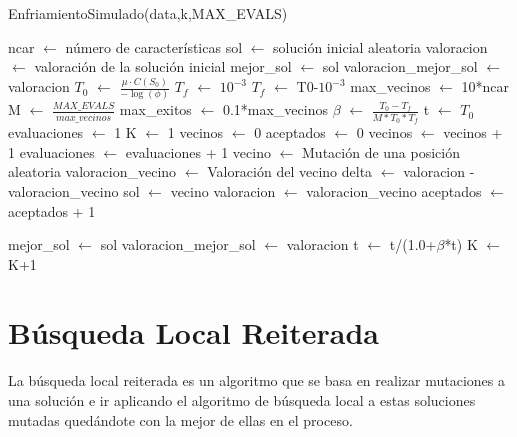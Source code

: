 \documentclass[12pt,a4paper]{article}
\begin{document}
	\begin{algorithm}
		\caption{EnfriamientoSimulado(data,k,MAX\_EVALS)}
		\begin{algorithmic}
			\STATE ncar $\leftarrow$ número de características
			\STATE sol  $\leftarrow$ solución inicial aleatoria
			\STATE valoracion $\leftarrow$ valoración de la solución inicial
			\STATE mejor\_sol $\leftarrow$ sol
			\STATE valoracion\_mejor\_sol $\leftarrow$ valoracion
			\STATE
			\STATE $T_0$ $\leftarrow$ $\frac{\mu  \cdot C(S_0)}{-\log(\phi)}$
			\STATE
				\STATE $T_f$ $\leftarrow$ $10^{-3}$
			\ELSE
				\STATE $T_f$  $\leftarrow$ T0-$10^{-3}$
			\ENDIF
			\STATE max\_vecinos $\leftarrow$ 10*ncar
			\STATE M $\leftarrow$ $\frac{MAX\_EVALS}{max\_vecinos}$
			\STATE max\_exitos $\leftarrow$ 0.1*max\_vecinos
			\STATE
			\STATE $\beta$ $\leftarrow$ $\frac{T_0-T_f}{M*T_0*T_f}$
			\STATE
			\STATE t $\leftarrow$ $T_0$
			\STATE evaluaciones $\leftarrow$ 1
			\STATE K $\leftarrow$ 1
				\STATE vecinos $\leftarrow$ 0
				\STATE aceptados $\leftarrow$ 0
					\STATE vecinos $\leftarrow$ vecinos + 1
					\STATE evaluaciones $\leftarrow$ evaluaciones + 1
					\STATE vecino $\leftarrow$ Mutación de una posición aleatoria
					\STATE valoracion\_vecino $\leftarrow$ Valoración del vecino
					\STATE delta $\leftarrow$ valoracion - valoracion\_vecino
						\STATE sol $\leftarrow$ vecino
						\STATE valoracion $\leftarrow$ valoracion\_vecino
						\STATE aceptados $\leftarrow$ aceptados + 1
						
							\STATE mejor\_sol $\leftarrow$ sol
							\STATE valoracion\_mejor\_sol $\leftarrow$ valoracion
						\ENDIF
					\ENDIF
				\ENDWHILE
				\STATE t $\leftarrow$ t/(1.0+$\beta$*t)
				\STATE K $\leftarrow$ K+1
			\ENDWHILE
		\end{algorithmic}
	\end{algorithm}
	
	\newpage
	
	\section{Búsqueda Local Reiterada}
	\label{sec:ILS}
	
	La búsqueda local reiterada es un algoritmo que se basa en realizar mutaciones a una solución e ir aplicando el algoritmo de búsqueda local a estas soluciones mutadas quedándote con la mejor de ellas en el proceso.
	
\end{document}
